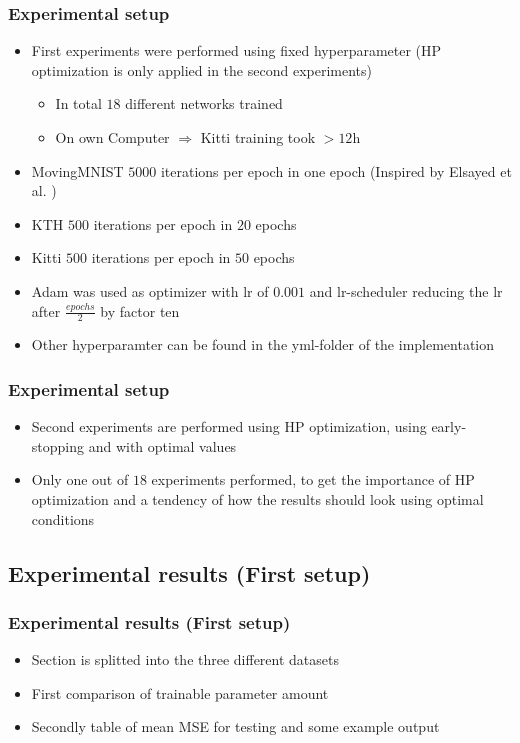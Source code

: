   \begin{frame}
   \frametitle{Experimental setup}
   
   \begin{itemize}
    \item<1-> First experiments were performed using fixed hyperparameter (HP optimization is only applied in the second experiments)
    \begin{itemize}
     \item<2-> In total $18$ different networks trained
     \item<3-> On own Computer $\Rightarrow$ Kitti training took $>12$h
    \end{itemize}
    \item<4-> MovingMNIST $5000$ iterations per epoch in one epoch (Inspired by Elsayed et al. \cite{Elsayed2018})
    \item<5-> KTH $500$ iterations per epoch in $20$ epochs
    \item<6-> Kitti $500$ iterations per epoch in $50$ epochs
    \item<7-> Adam \cite{Kingma2015} was used as optimizer with lr of $0.001$ and lr-scheduler reducing the lr after $\frac{epochs}{2}$ by factor ten
    \item<8-> Other hyperparamter can be found in the yml-folder of the implementation
   \end{itemize}      
   
  \end{frame}
  \begin{frame}
   \frametitle{Experimental setup}
   
   \begin{itemize}
    \item<1-> Second experiments are performed using HP optimization, using early-stopping and with \glqq optimal values\grqq
    \item<2-> Only one out of $18$ experiments performed, to get the importance of HP optimization and a tendency of how the results should look using optimal 
    conditions
   \end{itemize}
   
  \end{frame}
  
 \subsection{Experimental results (First setup)}
  \begin{frame}
   \frametitle{Experimental results (First setup)}
   
   \begin{itemize}
    \item<1-> Section is splitted into the three different datasets
    \item<2-> First comparison of trainable parameter amount
    \item<3-> Secondly table of mean MSE for testing and some example output
   \end{itemize}
  \end{frame}   
 
